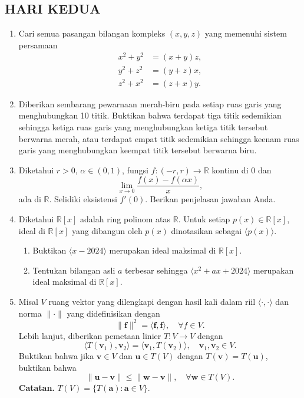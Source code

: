 \documentclass[12pt,twoside]{article}
\begin{document}
\subsection{HARI KEDUA}
\begin{enumerate}
    \item Cari semua pasangan bilangan kompleks $(x, y, z)$ yang memenuhi sistem persamaan
          \[
              \begin{aligned}
                  x^2 + y^2 & = (x + y)z, \\
                  y^2 + z^2 & = (y + z)x, \\
                  z^2 + x^2 & = (z + x)y.
              \end{aligned}
          \]

    \item Diberikan sembarang pewarnaan merah-biru pada setiap ruas garis yang menghubungkan 10 titik. Buktikan bahwa terdapat tiga titik sedemikian sehingga ketiga ruas garis yang menghubungkan ketiga titik tersebut berwarna merah, atau terdapat empat titik sedemikian sehingga keenam ruas garis yang menghubungkan keempat titik tersebut berwarna biru.

    \item Diketahui $r > 0$, $\alpha \in (0,1)$, fungsi $f : (-r, r) \to \mathbb{R}$ kontinu di $0$ dan
          \[
              \lim_{x \to 0} \frac{f(x) - f(\alpha x)}{x},
          \]
          ada di $\mathbb{R}$. Selidiki eksistensi $f'(0)$. Berikan penjelasan jawaban Anda.
    \item Diketahui $\mathbb{R}[x]$ adalah ring polinom atas $\mathbb{R}$. Untuk setiap $p(x) \in \mathbb{R}[x]$, ideal di $\mathbb{R}[x]$ yang dibangun oleh $p(x)$ dinotasikan sebagai $\langle p(x) \rangle$.
          \begin{enumerate}
              \item Buktikan $\langle x - 2024 \rangle$ merupakan ideal maksimal di $\mathbb{R}[x]$.
              \item Tentukan bilangan asli $a$ terbesar sehingga $\langle x^2 + ax + 2024 \rangle$ merupakan ideal maksimal di $\mathbb{R}[x]$.
          \end{enumerate}

    \item Misal $V$ ruang vektor yang dilengkapi dengan hasil kali dalam riil $\langle \cdot, \cdot \rangle$ dan norma $\|\cdot\|$ yang didefinisikan dengan
          \[
              \|\textbf{f}\|^2 = \langle \textbf{f}, \textbf{f} \rangle, \quad \forall f \in V.
          \]
          Lebih lanjut, diberikan pemetaan linier $T : V \to V$ dengan
          \[
              \langle T(\mathbf{v}_1), \mathbf{v}_2 \rangle = \langle \mathbf{v}_1, T(\mathbf{v}_2) \rangle, \quad \mathbf{v}_1, \mathbf{v}_2 \in V.
          \]
          Buktikan bahwa jika $\textbf{v} \in V$ dan $\textbf{u} \in T(V)$ dengan $T(\textbf{v}) = T(\textbf{u})$, buktikan bahwa
          \[
              \|\textbf{u} - \textbf{v}\| \leq \|\textbf{w} - \textbf{v}\|, \quad \forall \textbf{w} \in T(V).
          \]
          \textbf{Catatan.} $T(V) = \{T(\textbf{a}) : \textbf{a} \in V\}$.
\end{enumerate}
\end{document}
